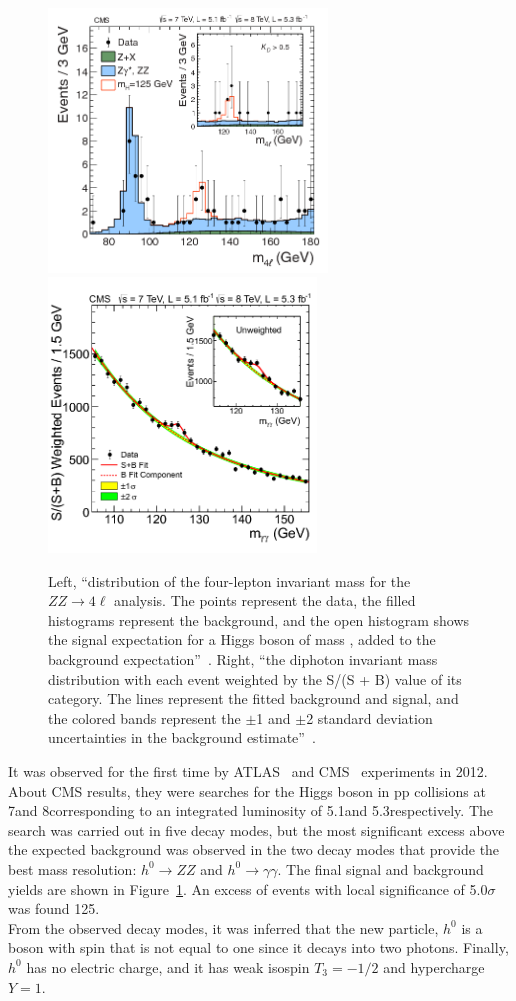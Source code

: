 \begin{figure}[h!]
\centering
\includegraphics[height=7cm]{Figures/c1/higgs_1.png}
\includegraphics[height=7.3cm]{Figures/c1/higgs_2.png}
\caption{Left, ``distribution of the four-lepton invariant mass for the $ZZ\rightarrow 4\ell$ analysis. The points represent the data, the filled histograms represent the background, and the open histogram shows the signal expectation for a Higgs boson of mass , added to the background expectation''~\cite{201230}. Right, ``the diphoton invariant mass distribution with each event weighted by the S/(S + B) value of its category. The lines represent the fitted background and signal, and the colored bands represent the $\pm$1 and $\pm$2 standard deviation uncertainties in the background estimate''~\cite{201230}.}
\label{fig:higgmass}
\end{figure}

It was observed for the first time by ATLAS~\cite{20121} and CMS~\cite{201230} experiments in 2012.
About CMS results, they were searches for the Higgs boson in pp collisions at 7\TeV and 8\TeV corresponding to an integrated luminosity of 5.1\fbinv and 5.3\fbinv respectively. The search was carried out in five decay modes, but the most significant excess above the expected background was observed in the two decay modes that provide the best mass resolution: $h^{0} \rightarrow ZZ$ and $h^{0} \rightarrow \gamma \gamma$. The final signal and background yields are shown in Figure~\ref{fig:higgmass}. An excess of events with local significance of 5.0$\sigma$ was found 125\GeV.\\
From the observed decay modes, it was inferred that the new particle, $h^{0}$ is a boson with spin that is not equal to one since it decays into two photons. Finally, $h^0$ has no electric charge, and it has weak isospin $T_3=-1/2$ and hypercharge $Y=1$.

